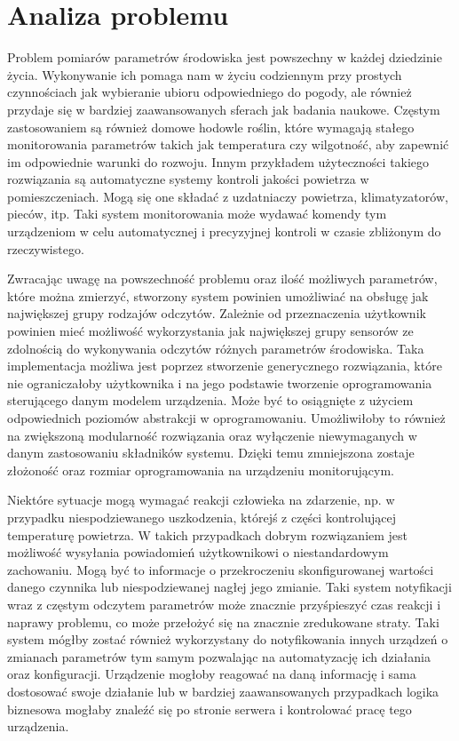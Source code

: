 \chapter{Analiza problemu}

Problem pomiarów parametrów środowiska jest powszechny w każdej dziedzinie życia.
Wykonywanie ich pomaga nam w życiu codziennym przy prostych czynnościach jak
wybieranie ubioru odpowiedniego do pogody, ale również przydaje się w bardziej
zaawansowanych sferach jak badania naukowe. Częstym zastosowaniem są również
domowe hodowle roślin, które wymagają stałego monitorowania parametrów
takich jak temperatura czy wilgotność, aby zapewnić im odpowiednie warunki
do rozwoju. Innym przykładem użyteczności takiego rozwiązania są automatyczne
systemy kontroli jakości powietrza w pomieszczeniach. Mogą się one składać
z uzdatniaczy powietrza, klimatyzatorów, pieców, itp. Taki system monitorowania
może wydawać komendy tym urządzeniom w celu automatycznej i precyzyjnej kontroli
w czasie zbliżonym do rzeczywistego.

Zwracając uwagę na powszechność problemu oraz ilość możliwych parametrów,
które można zmierzyć, stworzony system powinien umożliwiać na obsługę jak 
największej grupy rodzajów odczytów. Zależnie od przeznaczenia użytkownik
powinien mieć możliwość wykorzystania jak największej grupy sensorów ze
zdolnością do wykonywania odczytów różnych parametrów środowiska.
Taka implementacja możliwa jest poprzez stworzenie generycznego rozwiązania, które
nie ograniczałoby użytkownika i na jego podstawie tworzenie oprogramowania
sterującego danym modelem urządzenia.
Może być to osiągnięte z użyciem odpowiednich poziomów abstrakcji w oprogramowaniu.
Umożliwiłoby to również na zwiększoną modularność rozwiązania oraz
wyłączenie niewymaganych w danym zastosowaniu składników systemu.
Dzięki temu zmniejszona zostaje złożoność oraz rozmiar oprogramowania
na urządzeniu monitorującym.

Niektóre sytuacje mogą wymagać reakcji człowieka na zdarzenie, np.
w przypadku niespodziewanego uszkodzenia, którejś z części kontrolującej
temperaturę powietrza. W takich przypadkach dobrym rozwiązaniem jest możliwość
wysyłania powiadomień użytkownikowi o niestandardowym zachowaniu.
Mogą być to informacje o przekroczeniu skonfigurowanej wartości danego czynnika
lub niespodziewanej nagłej jego zmianie. Taki system notyfikacji wraz z
częstym odczytem parametrów może znacznie przyśpieszyć czas reakcji
i naprawy problemu, co może przełożyć się na znacznie zredukowane straty.
Taki system mógłby zostać również wykorzystany do notyfikowania innych
urządzeń o zmianach parametrów tym samym pozwalając na automatyzację
ich działania oraz konfiguracji. Urządzenie mogłoby reagować na daną 
informację i sama dostosować swoje działanie lub w bardziej zaawansowanych
przypadkach logika biznesowa mogłaby znaleźć się po stronie serwera i 
kontrolować pracę tego urządzenia.


